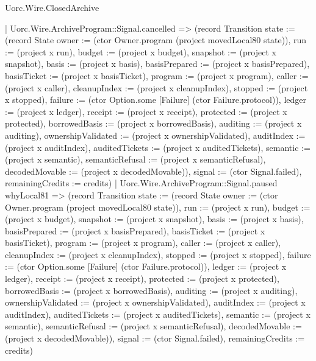 \begin{lexlean}{Uorc.Wire.ClosedArchive}
\begin{semanticmodule}
{        | Uorc.Wire.ArchiveProgram::Signal.cancelled => (record Transition {state := (record State {owner := (ctor Owner.program (project movedLocal80 state)), run := (project x run), budget := (project x budget), snapshot := (project x snapshot), basis := (project x basis), basisPrepared := (project x basisPrepared), basisTicket := (project x basisTicket), program := (project x program), caller := (project x caller), cleanupIndex := (project x cleanupIndex), stopped := (project x stopped), failure := (ctor Option.some [Failure] (ctor Failure.protocol)), ledger := (project x ledger), receipt := (project x receipt), protected := (project x protected), borrowedBasis := (project x borrowedBasis), auditing := (project x auditing), ownershipValidated := (project x ownershipValidated), auditIndex := (project x auditIndex), auditedTickets := (project x auditedTickets), semantic := (project x semantic), semanticRefusal := (project x semanticRefusal), decodedMovable := (project x decodedMovable)}), signal := (ctor Signal.failed), remainingCredits := credits})
        | Uorc.Wire.ArchiveProgram::Signal.paused whyLocal81 => (record Transition {state := (record State {owner := (ctor Owner.program (project movedLocal80 state)), run := (project x run), budget := (project x budget), snapshot := (project x snapshot), basis := (project x basis), basisPrepared := (project x basisPrepared), basisTicket := (project x basisTicket), program := (project x program), caller := (project x caller), cleanupIndex := (project x cleanupIndex), stopped := (project x stopped), failure := (ctor Option.some [Failure] (ctor Failure.protocol)), ledger := (project x ledger), receipt := (project x receipt), protected := (project x protected), borrowedBasis := (project x borrowedBasis), auditing := (project x auditing), ownershipValidated := (project x ownershipValidated), auditIndex := (project x auditIndex), auditedTickets := (project x auditedTickets), semantic := (project x semantic), semanticRefusal := (project x semanticRefusal), decodedMovable := (project x decodedMovable)}), signal := (ctor Signal.failed), remainingCredits := credits})
}
\end{semanticmodule}
\end{lexlean}
